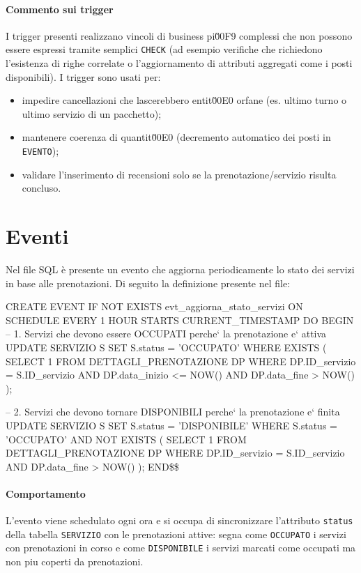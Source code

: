 \documentclass[a4paper,12pt]{report}
\begin{document}
\paragraph{Commento sui trigger}
I trigger presenti realizzano vincoli di business pi\u00F9 complessi che non possono essere espressi tramite semplici \texttt{CHECK} (ad esempio verifiche che richiedono l'esistenza di righe correlate o l'aggiornamento di attributi aggregati come i posti disponibili). I trigger sono usati per:
\begin{itemize}
	\item impedire cancellazioni che lascerebbero entit\u00E0 orfane (es. ultimo turno o ultimo servizio di un pacchetto);
	\item mantenere coerenza di quantit\u00E0 (decremento automatico dei posti in \texttt{EVENTO});
	\item validare l'inserimento di recensioni solo se la prenotazione/servizio risulta concluso.
\end{itemize}

\section{Eventi}
Nel file SQL è presente un evento che aggiorna periodicamente lo stato dei servizi in base alle prenotazioni. Di seguito la definizione presente nel file:

\begin{sqlcode}[caption={EVENTI},label={lst:eventi}]

	CREATE EVENT IF NOT EXISTS evt_aggiorna_stato_servizi
	ON SCHEDULE EVERY 1 HOUR
	STARTS CURRENT_TIMESTAMP
	DO
	BEGIN
	-- 1. Servizi che devono essere OCCUPATI perche` la prenotazione  e` attiva
	UPDATE SERVIZIO S
	SET S.status = 'OCCUPATO'
	WHERE EXISTS (
	SELECT 1
	FROM DETTAGLI_PRENOTAZIONE DP
	WHERE DP.ID_servizio = S.ID_servizio
	AND DP.data_inizio <= NOW()
	AND DP.data_fine > NOW()
	);

	-- 2. Servizi che devono tornare DISPONIBILI perche` la prenotazione  e` finita
	UPDATE SERVIZIO S
	SET S.status = 'DISPONIBILE'
	WHERE S.status = 'OCCUPATO'
	AND NOT EXISTS (
	SELECT 1
	FROM DETTAGLI_PRENOTAZIONE DP
	WHERE DP.ID_servizio = S.ID_servizio
	AND DP.data_fine > NOW()
	);
	END\$\$
\end{sqlcode}

\paragraph{Comportamento}
L'evento viene schedulato ogni ora e si occupa di sincronizzare l'attributo \texttt{status} della tabella \texttt{SERVIZIO} con le prenotazioni attive: segna come \texttt{OCCUPATO} i servizi con prenotazioni in corso e come \texttt{DISPONIBILE} i servizi marcati come occupati ma non piu coperti da prenotazioni.
\end{document}
